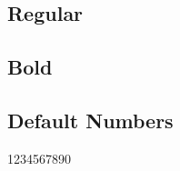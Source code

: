\documentclass{article}
\begin{document}
\subsection*{Regular}
\lipsum[1]


\subsection*{Bold}

\textbf{\lipsum[2]}












\subsection*{Default Numbers}

1234567890
\end{document}

